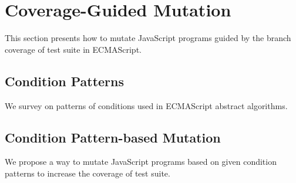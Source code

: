 \section{Coverage-Guided Mutation}\label{sec:mutation}

This section presents how to mutate JavaScript programs guided by the branch
coverage of test suite in ECMAScript.


\subsection{Condition Patterns}

We survey on patterns of conditions used in ECMAScript abstract algorithms.


\subsection{Condition Pattern-based Mutation}

We propose a way to mutate JavaScript programs based on given condition patterns
to increase the coverage of test suite.

